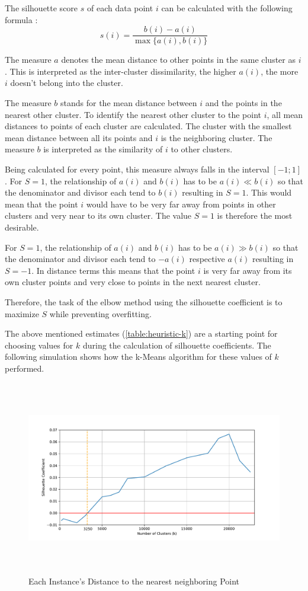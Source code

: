 The silhouette score $s$ of each data point $i$ can be calculated with the following formula \cite{kodinariyaReviewDeterminingCluster2013}:
\[ s(i) = \frac{b(i) - a(i)}{\max\{a(i),b(i)\}} \]

The measure $a$ denotes the mean distance to other points in the same cluster as $i$. This is interpreted as the inter-cluster dissimilarity, the higher $a(i)$, the more $i$ doesn't belong into the cluster.

The measure $b$ stands for the mean distance between $i$ and the points in the nearest other cluster. To identify the nearest other cluster to the point $i$, all mean distances to points of each cluster are calculated. The cluster with the smallest mean distance between all its points and $i$ is the neighboring cluster. The measure $b$ is interpreted as the similarity of $i$ to other clusters.

Being calculated for every point, this measure always falls in the interval $[-1;1]$. For $S = 1$, the relationship of $a(i)$ and $b(i)$ has to be $a(i) \ll b(i)$ so that the denominator and divisor each tend to $b(i)$ resulting in $S = 1$. This would mean that the point $i$ would have to be very far away from points in other clusters and very near to its own cluster. The value $S = 1$ is therefore the most desirable.

For $S = 1$, the relationship of $a(i)$ and $b(i)$ has to be $a(i) \gg b(i)$ so that the denominator and divisor each tend to $-a(i)$ respective $a(i)$ resulting in $S = -1$. In distance terms this means that the point $i$ is very far away from its own cluster points and very close to points in the next nearest cluster.

Therefore, the task of the elbow method using the silhouette coefficient is to maximize $S$ while preventing overfitting.

The above mentioned estimates (\ref{table:heuristic-k}) are a starting point for choosing values for $k$ during the calculation of silhouette coefficients. The following simulation shows how the k-Means algorithm for these values of $k$ performed.

 \begin{figure}[!h]
	\centering
	\includegraphics[height=8.5cm]{Bilder/models/elbow.pdf}
	\caption{Each Instance's Distance to the nearest neighboring Point}
	\label{fig:silhouette}
\end{figure}

